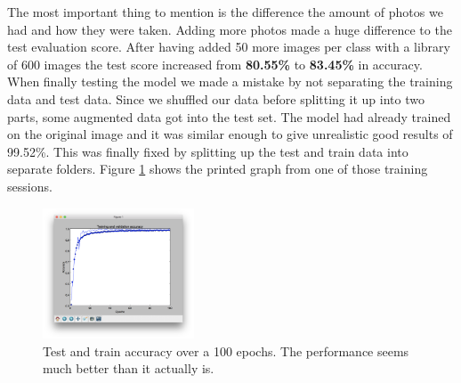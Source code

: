 The most important thing to mention is the difference the amount of photos we had and how they
were taken. Adding more photos made a huge difference to the test evaluation score.
After having added 50 more images per class with a library of 600 images the test score increased
from \textbf{80.55\%} to \textbf{83.45\%} in accuracy. \\

When finally testing the model we made a mistake by not separating the training data and test data.
Since we shuffled our data before splitting it up into two parts, some augmented data got into the
test set. The model had already trained on the original image and it was similar enough to
give unrealistic good results of 99.52\%. This was finally fixed by splitting up the test and train data 
into separate folders. Figure \ref{fig:augmentedtestdata} shows the printed graph from one of those
training sessions.

\begin{figure}[!hbtp]
\begin{center}
\includegraphics[width = 0.4\textwidth]{./Images/augmentedtestdata}
\caption{Test and train accuracy over a 100 epochs. The performance seems much better than it actually is.}
\label{fig:augmentedtestdata}
\end{center}
\end{figure}

